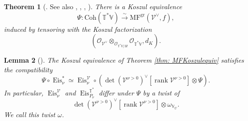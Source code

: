 \documentclass{amsart}
\newtheorem{theorem}{Theorem}[subsection]
\newtheorem{lemma}[theorem]{Lemma}
\theoremstyle{definition}
\theoremstyle{remark}
\numberwithin{equation}{section}
\DeclareMathOperator{\rank}{rank}
\newcommand{\mc}{\mathcal}
\DeclareMathOperator{\Eis}{\mathrm{Eis}}
\newcommand{\Coh}{\mathrm{Coh}}
\newcommand{\V}{\mathbb{V}}
\newcommand{\T}{\mathbb{T}}
\DeclareMathOperator{\gr}{gr}
\newcommand{\MF}{\mathrm{MF}}
\begin{document}
\begin{theorem}[{\cite[Theorem 2.3.3]{TodaBook}. See also \cite{Shipman}, \cite{Isik}, \cite{Hirano}, \cite{oblomkovrozansky}}]{\label{thm: MFKoszulequiv}}
There is a Koszul equivalence 
    \begin{equation*}
        \Psi: \Coh(\T^{\ast}\V) \xrightarrow{\sim} \MF^{\gr}(\mc{V}^{\vee}, f),
    \end{equation*}
    induced by tensoring with the Koszul factorization
    \begin{equation*}
        (\mc{O}_{\mc{V}^{\vee}} \otimes_{\mc{O}_{\T^{\ast}V/H}} \mc{O}_{\T^{\ast}\V}, d_K).
    \end{equation*}
\end{theorem}
\begin{lemma}[{\cite[Proposition 2.27]{PTqBPSsymquiverswithpotential}}]{\label{lem: MFcotaneiscompatibility}}
The Koszul equivalence of Theorem \ref{thm: MFKoszulequiv} satisfies the compatibility
\begin{equation*}
 \Psi \circ \Eis^{\ast}_{\nu} \simeq \Eis^{\mc{V}}_{\nu}\circ ( \det(\mc{V}^{\nu > 0})^{\vee}[\rank \mc{V}^{\nu >0}]\otimes   \Psi).
\end{equation*}
In particular, $\Eis^{\mc{V}}_{\nu}$ and $\Eis^{\T^{\ast}}_{P_\nu}$ differ under $\Psi$ by a twist of
\begin{equation*}
    \det(\mc{V}^{\nu > 0})^{\vee}[\rank \mc{V}^{\nu >0}] \otimes \omega_{\V_U} .
\end{equation*}
We call this twist $\omega$. 
\end{lemma}
\end{document}
